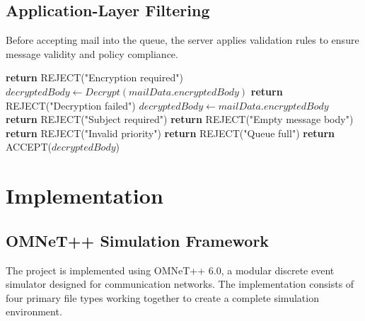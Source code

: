 \documentclass[12pt]{article}
\begin{document}
	\subsection{Application-Layer Filtering}
	
	Before accepting mail into the queue, the server applies validation rules to ensure message validity and policy compliance.
	
	\begin{algorithm}[H]
		\caption{Mail Filtering and Validation}
		\label{alg:filtering}
		\begin{algorithmic}[1]
			\State {}
			\State \textbf{return} REJECT("Encryption required")
			\EndIf
			\State
			\State {}
			\State $decryptedBody \gets Decrypt(mailData.encryptedBody)$
			\State \textbf{return} REJECT("Decryption failed")
			\EndIf
			\Else
			\State $decryptedBody \gets mailData.encryptedBody$
			\EndIf
			\State
			\State {}
			\State \textbf{return} REJECT("Subject required")
			\EndIf
			\State
			\State \textbf{return} REJECT("Empty message body")
			\EndIf
			\State
			\State {}
			\State \textbf{return} REJECT("Invalid priority")
			\EndIf
			\State
			\State {}
			\State \textbf{return} REJECT("Queue full")
			\EndIf
			\State
			\State \textbf{return} ACCEPT($decryptedBody$)
			\EndFunction
		\end{algorithmic}
	\end{algorithm}
	
	\section{Implementation}
	
	\subsection{OMNeT++ Simulation Framework}
	
	The project is implemented using OMNeT++ 6.0, a modular discrete event simulator designed for communication networks. The implementation consists of four primary file types working together to create a complete simulation environment.
	
\end{document}
